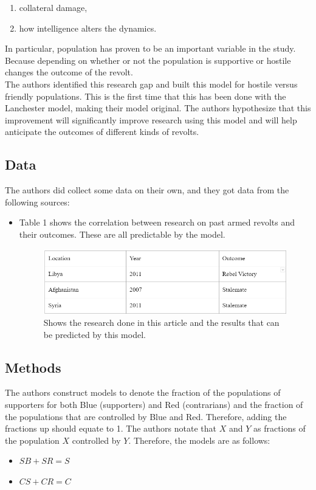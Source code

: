 \documentclass{article}
\begin{document}
\begin{enumerate}
    \item collateral damage,
    \item how intelligence alters the dynamics.
\end{enumerate}
In particular, population has proven to be an important variable in the study. Because depending on whether or not the population is supportive or hostile changes the outcome of the revolt.
\medskip
\\The authors identified this research gap and built this model for hostile versus friendly populations. This is the first time that this has been done with the Lanchester model, making their model original. The authors hypothesize that this improvement will significantly improve research using this model and will help anticipate the outcomes of different kinds of revolts.
\subsection{Data}
The authors did collect some data on their own, and they got data from the following sources: 
\begin{itemize}
    \item Table 1 shows the correlation between research on past armed revolts and their outcomes. These are all predictable by the model.
    \begin{figure}[htpb]
        \centering
        \includegraphics{datasample.png}
        \caption{Shows the research done in this article and the results that can be predicted by this model.}
        \label{Table 1}
    \end{figure}
\end{itemize}
\subsection{Methods}
The authors construct models to denote the fraction of the populations of supporters for both Blue (supporters) and Red (contrarians) and the fraction of the populations that are controlled by Blue and Red. Therefore, adding the fractions up should equate to 1. The authors notate that $X$ and $Y$ as fractions of the population $X$ controlled by $Y$. Therefore, the models are as follows:
\begin{itemize}
    \item $SB + SR = S$
    \item $CS + CR = C$
\end{itemize}
\medskip
\end{document}
